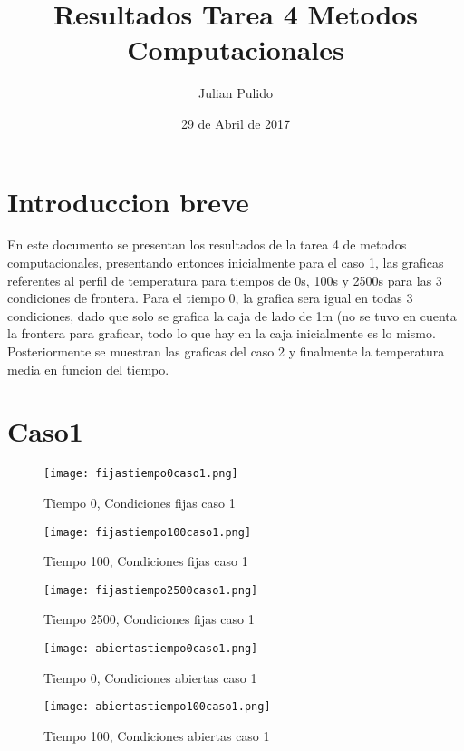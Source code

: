 \documentclass{article}
\begin{document}
\title{Resultados Tarea 4 Metodos Computacionales}
\author{Julian Pulido}
\date{ 29 de Abril de 2017}
\maketitle

\section{Introduccion breve}
En este documento se presentan los resultados de la tarea 4 de metodos computacionales, presentando entonces inicialmente para el caso 1, las graficas referentes al perfil de temperatura para tiempos de 0s, 100s y 2500s para las 3 condiciones de frontera. Para el tiempo 0, la grafica sera igual en todas 3 condiciones, dado que solo se grafica la caja de lado de 1m (no se tuvo en cuenta la frontera para graficar, todo lo que hay en la caja inicialmente es lo mismo. Posteriormente se muestran las graficas del caso 2 y finalmente la temperatura media en funcion del tiempo.


\section{Caso1}
\begin{figure}
\centering
\texttt{[image: fijastiempo0caso1.png]}
\caption{ Tiempo 0, Condiciones fijas caso 1}
 \end{figure}

\begin{figure}
 \centering
\texttt{[image: fijastiempo100caso1.png]}
 \caption{ Tiempo 100, Condiciones fijas caso 1}
 \end{figure}

\begin{figure}
 \centering
\texttt{[image: fijastiempo2500caso1.png]}
 \caption{ Tiempo 2500, Condiciones fijas caso 1}
 \end{figure}



\begin{figure}
 \centering
\texttt{[image: abiertastiempo0caso1.png]}
 \caption{ Tiempo 0, Condiciones abiertas caso 1}
 \end{figure}

\begin{figure}
 \centering
\texttt{[image: abiertastiempo100caso1.png]}
 \caption{ Tiempo 100, Condiciones abiertas caso 1}
 \end{figure}
\end{document}
